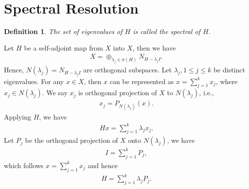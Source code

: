 \documentclass[11pt]{book}
\newtheorem{definition}{Definition}[section]
\theoremstyle{definition}
\numberwithin{equation}{subsection}
\begin{document}
\medskip

\section{Spectral Resolution}

\begin{definition}
The set of eigenvalues of $H$ is called the spectral of $H$.
\end{definition}

\medskip

Let $H$ be a self-adjoint map from $X$ into $X$, then we have 
\begin{align*}
    X = \oplus_{\lambda_j \in \sigma(H)}N_{H - \lambda_j I}.
\end{align*}
Hence, $N(\lambda_j) = N_{H - \lambda_j I}$ are orthogonal subspaces. Let $\lambda_j, 1\leq j\leq k$ be distinct eigenvalues. For any $x\in X$, then $x$ can be represented as $x = \sum^k_{j=1}x_j$, where $x_j\in N(\lambda_j)$. We say $x_j$ is orthogonal projection of $X$ to $N(\lambda_j)$, i.e., 
\begin{align*}
    x_j = P_{N(\lambda_j)}(x).
\end{align*}
Applying $H$, we have
\begin{align*}
    Hx = \sum^k_{j=1} \lambda_j x_j.
\end{align*}
Let $P_j$ be the orthogonal projection of $X$ onto $N(\lambda_j)$, we have
\begin{align*}
    I = \sum^k_{j=1} P_j,
\end{align*}
which follows $x = \sum^k_{j=1}x_j$ and hence 
\begin{align*}
    H = \sum^k_{j=1} \lambda_j P_j.
\end{align*}

\medskip
\end{document}
